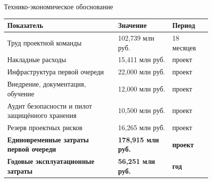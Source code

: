 \documentclass{beamer}
\begin{document}
\begin{frame}{Технико-экономическое обоснование}
  \scriptsize
  \begin{table}
    \centering
    \begin{tabular}{L{0.45\linewidth} C{0.22\linewidth} C{0.16\linewidth}}
      \toprule
      \textbf{Показатель} & \textbf{Значение} & \textbf{Период} \\
      \midrule
      Труд проектной команды & 102,739 млн руб. & 18 месяцев \\
      Накладные расходы & 15,411 млн руб. & проект \\
      Инфраструктура первой очереди & 22,000 млн руб. & проект \\
      Внедрение, документация, обучение & 12,000 млн руб. & проект \\
      Аудит безопасности и пилот защищённого хранения & 10,500 млн руб. & проект \\
      Резерв проектных рисков & 16,265 млн руб. & проект \\
      \midrule
      \textbf{Единовременные затраты первой очереди} & \textbf{178,915 млн руб.} & \textbf{проект} \\
      \textbf{Годовые эксплуатационные затраты} & \textbf{56,251 млн руб.} & \textbf{год} \\
      \bottomrule
    \end{tabular}
  \end{table}
\end{frame}
\end{document}
